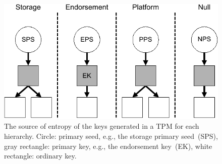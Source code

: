 \begin{figure}[htpb]
  \centering
  \includegraphics[width=0.8\linewidth]{figures/tpm-hierarchies.pdf}
  \caption{The source of entropy of the keys generated in a TPM for each hierarchy. Circle: primary seed, e.g., the storage primary seed~(SPS), gray rectangle: primary key, e.g., the endorsement key~(EK), white rectangle: ordinary key.
  }\label{fig:tpm-hierarchies}
\end{figure}
